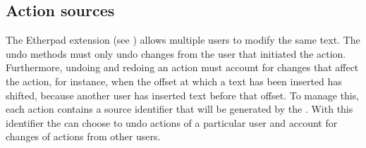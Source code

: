 
\subsection{Action sources}

The Etherpad extension (see ) allows multiple users to modify the same text. The undo methods must only undo changes from the user that initiated the action. Furthermore, undoing and redoing an action must account for changes that affect the action, for instance, when the offset at which a text has been inserted has shifted, because another user has inserted text before that offset. To manage this, each action contains a source identifier that will be generated by the . With this identifier the  can choose to undo actions of a particular user and account for changes of actions from other users.





